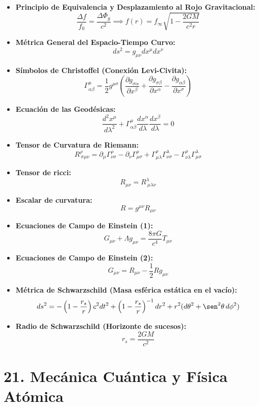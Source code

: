 \documentclass[11pt,a4paper]{article}
\begin{document}
\begin{itemize}
  \item \textbf{Principio de Equivalencia y Desplazamiento al Rojo Gravitacional:}
  \[
    \frac{\Delta f}{f_0} = \frac{\Delta\Phi_g}{c^2} \implies f(r) = f_\infty \sqrt{1 - \frac{2GM}{c^2 r}}
  \]
  \item \textbf{Métrica General del Espacio-Tiempo Curvo:}
  \[
    ds^2 = g_{\mu\nu} dx^\mu dx^\nu
  \]
  \item \textbf{Símbolos de Christoffel (Conexión Levi-Civita):}
  \[
    \Gamma^\mu_{\alpha\beta} = \frac{1}{2} g^{\mu\sigma} \left( \frac{\partial g_{\sigma\alpha}}{\partial x^\beta} + \frac{\partial g_{\sigma\beta}}{\partial x^\alpha} - \frac{\partial g_{\alpha\beta}}{\partial x^\sigma} \right)
  \]
  \item \textbf{Ecuación de las Geodésicas:}
  \[
    \frac{d^2 x^\mu}{d\lambda^2} + \Gamma^\mu_{\alpha\beta} \frac{dx^\alpha}{d\lambda} \frac{dx^\beta}{d\lambda} = 0
  \]
  \item \textbf{Tensor de Curvatura de Riemann:}
  \[
    R^\rho_{\ \sigma\mu\nu} = \partial_\mu \Gamma^\rho_{\nu\sigma} - \partial_\nu \Gamma^\rho_{\mu\sigma} + \Gamma^\rho_{\mu\lambda} \Gamma^\lambda_{\nu\sigma} - \Gamma^\rho_{\nu\lambda} \Gamma^\lambda_{\mu\sigma}
  \]
  \item \textbf{Tensor de ricci:}
  \[
    R_{\mu\nu} = R^\lambda_{\ \mu\lambda\nu}
  \]
  \item \textbf{Escalar de curvatura:}
  \[
    R = g^{\mu\nu} R_{\mu\nu}
  \]
  \item \textbf{Ecuaciones de Campo de Einstein (1):}
  \[
    G_{\mu\nu} + \Lambda g_{\mu\nu} = \frac{8\pi G}{c^4} T_{\mu\nu}
  \]
  \item \textbf{Ecuaciones de Campo de Einstein (2):}
  \[
    G_{\mu\nu} = R_{\mu\nu} - \frac{1}{2} R g_{\mu\nu}
  \]
  \item \textbf{Métrica de Schwarzschild (Masa esférica estática en el vacío):}
  \[
    ds^2 = -\left( 1 - \frac{r_s}{r} \right) c^2 dt^2 + \left( 1 - \frac{r_s}{r} \right)^{-1} dr^2 + r^2 (d\theta^2 + \sen^2\theta \, d\phi^2)
  \]
  \item \textbf{Radio de Schwarzschild (Horizonte de sucesos):}
  \[
    r_s = \frac{2GM}{c^2}
  \]
\end{itemize}

\section*{21. Mecánica Cuántica y Física Atómica}
\end{document}
